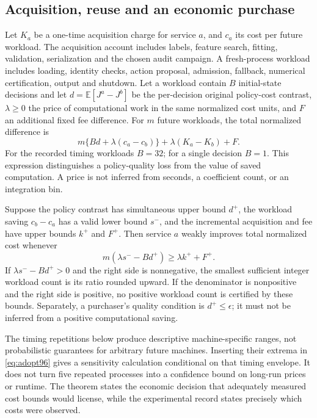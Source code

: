\subsection{Acquisition, reuse and an economic purchase}
Let $K_a$ be a one-time acquisition charge for service $a$, and $c_a$ its cost per future workload. The acquisition account includes labels, feature search, fitting, validation, serialization and the chosen audit campaign. A fresh-process workload includes loading, identity checks, action proposal, admission, fallback, numerical certification, output and shutdown. Let a workload contain $B$ initial-state decisions and let $d=\mathbb E[J^a-J^b]$ be the per-decision original policy-cost contrast, $\lambda\geq0$ the price of computational work in the same normalized cost units, and $F$ an additional fixed fee difference. For $m$ future workloads, the total normalized difference is
\begin{equation}\label{eq:purchase96}
 m\{B d+\lambda(c_a-c_b)\}+\lambda(K_a-K_b)+F.
\end{equation}
For the recorded timing workloads $B=32$; for a single decision $B=1$. This expression distinguishes a policy-quality loss from the value of saved computation. A price is not inferred from seconds, a coefficient count, or an integration bin.

\begin{proposition}\label{prop:purchase96}
Suppose the policy contrast has simultaneous upper bound $d^+$, the workload saving $c_b-c_a$ has a valid lower bound $s^-$, and the incremental acquisition and fee have upper bounds $k^+$ and $F^+$. Then service $a$ weakly improves total normalized cost whenever
\begin{equation}\label{eq:adopt96}
 m(\lambda s^- -B d^+)\geq\lambda k^++F^+.
\end{equation}
If $\lambda s^- -B d^+>0$ and the right side is nonnegative, the smallest sufficient integer workload count is its ratio rounded upward. If the denominator is nonpositive and the right side is positive, no positive workload count is certified by these bounds. Separately, a purchaser's quality condition is $d^+\leq\epsilon$; it must not be inferred from a positive computational saving.
\end{proposition}

The timing repetitions below produce descriptive machine-specific ranges, not probabilistic guarantees for arbitrary future machines. Inserting their extrema in \eqref{eq:adopt96} gives a sensitivity calculation conditional on that timing envelope. It does not turn five repeated processes into a confidence bound on long-run prices or runtime. The theorem states the economic decision that adequately measured cost bounds would license, while the experimental record states precisely which costs were observed.
